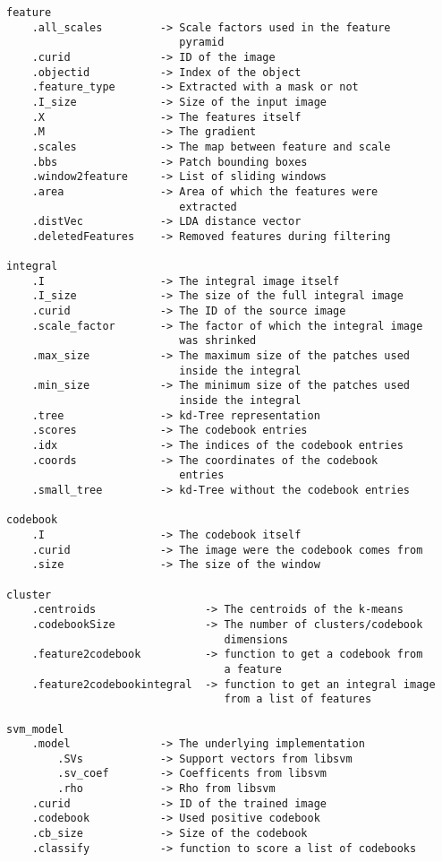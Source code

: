 \begin{verbatim}
feature
    .all_scales         -> Scale factors used in the feature
                           pyramid
    .curid              -> ID of the image
    .objectid           -> Index of the object
    .feature_type       -> Extracted with a mask or not
    .I_size             -> Size of the input image
    .X                  -> The features itself
    .M                  -> The gradient
    .scales             -> The map between feature and scale
    .bbs                -> Patch bounding boxes
    .window2feature     -> List of sliding windows
    .area               -> Area of which the features were 
                           extracted
    .distVec            -> LDA distance vector
    .deletedFeatures    -> Removed features during filtering

integral
    .I                  -> The integral image itself
    .I_size             -> The size of the full integral image
    .curid              -> The ID of the source image
    .scale_factor       -> The factor of which the integral image
                           was shrinked
    .max_size           -> The maximum size of the patches used
                           inside the integral
    .min_size           -> The minimum size of the patches used
                           inside the integral
    .tree               -> kd-Tree representation
    .scores             -> The codebook entries
    .idx                -> The indices of the codebook entries
    .coords             -> The coordinates of the codebook
                           entries
    .small_tree         -> kd-Tree without the codebook entries

codebook
    .I                  -> The codebook itself
    .curid              -> The image were the codebook comes from
    .size               -> The size of the window

cluster
    .centroids                 -> The centroids of the k-means
    .codebookSize              -> The number of clusters/codebook
                                  dimensions
    .feature2codebook          -> function to get a codebook from
                                  a feature
    .feature2codebookintegral  -> function to get an integral image
                                  from a list of features

svm_model
    .model              -> The underlying implementation
        .SVs            -> Support vectors from libsvm
        .sv_coef        -> Coefficents from libsvm
        .rho            -> Rho from libsvm
    .curid              -> ID of the trained image
    .codebook           -> Used positive codebook
    .cb_size            -> Size of the codebook
    .classify           -> function to score a list of codebooks
\end{verbatim}